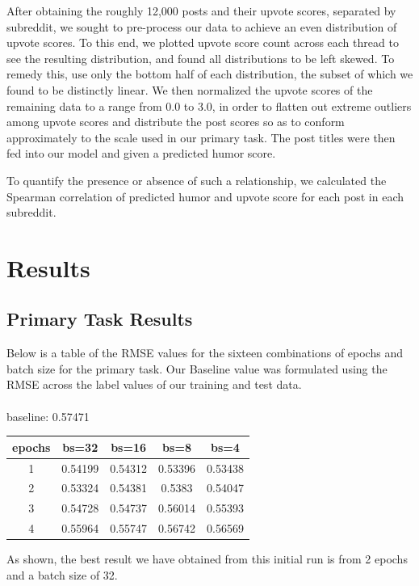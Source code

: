 \documentclass{article}
\begin{document}
After obtaining the roughly 12,000 posts and their upvote scores, separated by subreddit, we sought to pre-process our data to achieve an even distribution of upvote scores. To this end, we plotted upvote score count across each thread to see the resulting distribution, and found all distributions to be left skewed. To remedy this, use only the bottom half of each distribution, the subset of which we found to be distinctly linear. We then normalized the upvote scores of the remaining data to a range from 0.0 to 3.0, in order to flatten out extreme outliers among upvote scores and distribute the post scores so as to conform approximately to the scale used in our primary task. The post titles were then fed into our model and given a predicted humor score.

To quantify the presence or absence of such a relationship, we calculated the Spearman correlation of predicted humor and upvote score for each post in each subreddit. 

\section{Results}

\subsection{Primary Task Results}

Below is a table of the RMSE values for the sixteen combinations of epochs and batch size for the primary task. Our Baseline value was formulated using the RMSE across the label values of our training and test data.\\
\\
baseline: 0.57471

\begin{center}
\begin{tabular}{|c|c|c|c|c|}
\hline
epochs & bs=32 & bs=16 & bs=8 & bs=4 \\
\hline
1 & 0.54199 & 0.54312 & 0.53396 & 0.53438 \\
2 & 0.53324 & 0.54381 & 0.5383 & 0.54047 \\
3 & 0.54728 & 0.54737 & 0.56014 & 0.55393 \\
4 & 0.55964 & 0.55747 & 0.56742 & 0.56569 \\
\hline
\end{tabular}
\end{center}

As shown, the best result we have obtained from this initial run is from 2 epochs and a batch size of 32.
\end{document}

